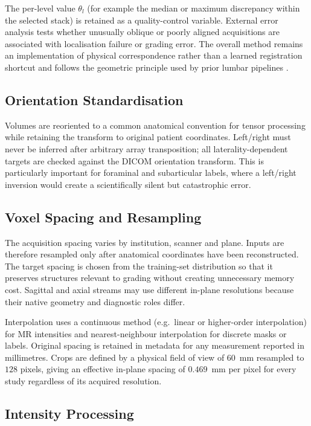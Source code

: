 The per-level value $\theta_l$ (for example the median or maximum discrepancy
within the selected stack) is retained as a quality-control variable. External
error analysis tests whether unusually oblique or poorly aligned acquisitions
are associated with localisation failure or grading error. The overall method
remains an implementation of physical correspondence rather than a learned
registration shortcut and follows the geometric principle used by prior lumbar
pipelines \cite{pan2021automatically,batra2025mscan}.

\subsection{Orientation Standardisation}
\label{sec:method-orientation}

Volumes are reoriented to a common anatomical convention for tensor processing
while retaining the transform to original patient coordinates. Left/right must
never be inferred after arbitrary array transposition; all laterality-dependent
targets are checked against the DICOM orientation transform. This is particularly
important for foraminal and subarticular labels, where a left/right inversion
would create a scientifically silent but catastrophic error.

\subsection{Voxel Spacing and Resampling}
\label{sec:method-resampling}

The acquisition spacing varies by institution, scanner and plane. Inputs are
therefore resampled only after anatomical coordinates have been reconstructed.
The target spacing is chosen from the training-set distribution so that it
preserves structures relevant to grading without creating unnecessary memory
cost. Sagittal and axial streams may use different in-plane resolutions because
their native geometry and diagnostic roles differ.

Interpolation uses a continuous method (e.g.\ linear or higher-order interpolation)
for MR intensities and nearest-neighbour interpolation for discrete masks or
labels. Original spacing is retained in metadata for any measurement reported
in millimetres. Crops are defined by a physical field of view of $60$~mm
resampled to $128$ pixels, giving an effective in-plane spacing of
$0.469$~mm per pixel for every study regardless of its acquired resolution.

\subsection{Intensity Processing}
\label{sec:method-intensity}


